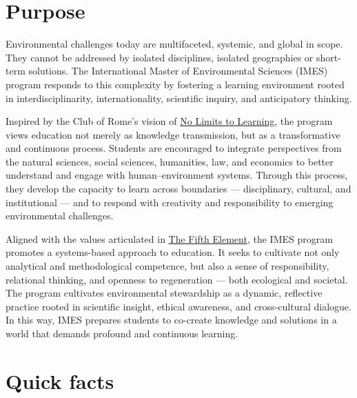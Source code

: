 \documentclass[
  letterpaper,
  10pt,
  openany]{book}
\begin{document}

\section*{Purpose}\label{purpose}


Environmental challenges today are multifaceted, systemic, and global in
scope. They cannot be addressed by isolated disciplines, isolated
geographies or short-term solutions. The International Master of
Environmental Sciences (IMES) program responds to this complexity by
fostering a learning environment rooted in interdisciplinarity,
internationality, scientific inquiry, and anticipatory thinking.

Inspired by the Club of Rome's vision of
\href{https://www.clubofrome.org/blog-post/bologna-qa-legacy-of-no-limits-to-learning/}{No
Limits to Learning}, the program views education not merely as knowledge
transmission, but as a transformative and continuous process. Students
are encouraged to integrate perspectives from the natural sciences,
social sciences, humanities, law, and economics to better understand and
engage with human--environment systems. Through this process, they
develop the capacity to learn across boundaries --- disciplinary,
cultural, and institutional --- and to respond with creativity and
responsibility to emerging environmental challenges.

Aligned with the values articulated in
\href{https://thefifthelement.earth/}{The Fifth Element}, the IMES
program promotes a systems-based approach to education. It seeks to
cultivate not only analytical and methodological competence, but also a
sense of responsibility, relational thinking, and openness to
regeneration --- both ecological and societal. The program cultivates
environmental stewardship as a dynamic, reflective practice rooted in
scientific insight, ethical awareness, and cross-cultural dialogue. In
this way, IMES prepares students to co-create knowledge and solutions in
a world that demands profound and continuous learning.

\section*{Quick facts}\label{quick-facts}
\end{document}
